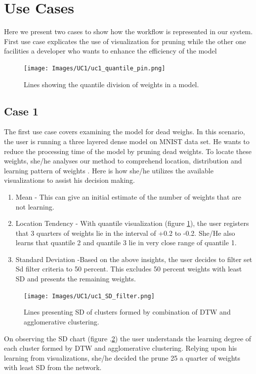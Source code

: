 \documentclass[journal]{vgtc}                %
\begin{document}
 


\section{Use Cases}
Here we present two cases to show how the workflow is represented in our system. First use case explicates the use of visualization for pruning while the other one facilities a developer who wants to enhance the efficiency of the model

\begin{figure}
    \texttt{[image: Images/UC1/uc1\_quantile\_pin.png]}
    \caption{Lines showing the quantile division of weights in a model.}
    \label{fig:quantile}
\end{figure}
\subsection{Case 1} The first use case covers examining
the model for dead weighs.
In this scenario, the user is running a three layered dense model on MNIST\cite{mnist} data set.
He wants to reduce the processing time of the model by pruning dead weights.
To locate these weights, she/he analyses our method to comprehend location, distribution and learning pattern of weights .
Here is how she/he utilizes the available visualizations to assist his decision making.
\begin{enumerate}
\item Mean - This can give an initial estimate of the number of weights that are not learning. 
\item Location Tendency - With quantile visualization (figure \ref{fig:quantile}), the user registers that 3 quarters of weights lie in the interval of +0.2 to -0.2. She/He also learns that quantile 2 and quantile 3 lie in very close range of quantile 1. 
\item Standard Deviation -Based on the above insights, the user decides to filter set Sd filter criteria to 50 percent. This excludes 50 percent weights with least SD and presents the remaining weights.
\end{enumerate}
\begin{figure}
    \texttt{[image: Images/UC1/uc1\_SD\_filter.png]}
    \caption{Lines presenting SD of clusters formed by combination of DTW and agglomerative clustering.}
    \label{fig:SD}
\end{figure}
On observing the SD chart (figure .\ref{fig:SD}) the user understands the learning degree of each cluster formed by DTW and agglomerative clustering. Relying upon his learning from visualizations, she/he decided the prune 25 a quarter of weights with least SD from the network.  
\end{document}
